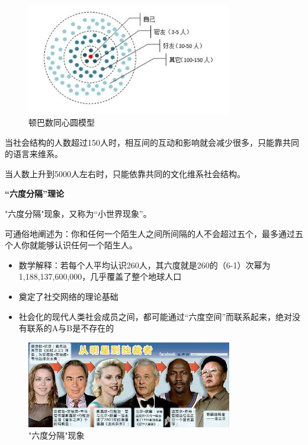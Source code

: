 \begin{frame}

	\begin{figure}[htbp]
		\centering
		\includegraphics[width=0.8\textwidth]{pic/t1.jpg}
		\caption{顿巴数同心圆模型}
	\end{figure}
	当社会结构的人数超过150人时，相互间的互动和影响就会减少很多，只能靠共同的语言来维系。
	
	当人数上升到5000人左右时，只能依靠共同的文化维系社会结构。

\end{frame}

\begin{frame}
	\textbf{“六度分隔”理论}
	
	"六度分隔"现象，又称为“小世界现象”。
	
	可通俗地阐述为：你和任何一个陌生人之间所间隔的人不会超过五个，最多通过五个人你就能够认识任何一个陌生人。
	\begin{itemize}
		\item 数学解释：若每个人平均认识260人，其六度就是260的（6-1）次幂为1,188,137,600,000，几乎覆盖了整个地球人口
		\item 奠定了社交网络的理论基础
		\item 社会化的现代人类社会成员之间，都可能通过“六度空间”而联系起来，绝对没有联系的A与B是不存在的
	\end{itemize}

\end{frame}

\begin{frame}

	\begin{figure}[htbp]
		\centering
		\includegraphics[width=0.8\textwidth]{pic/t2.jpg}
		\caption{"六度分隔"现象}
	\end{figure}

\end{frame}

